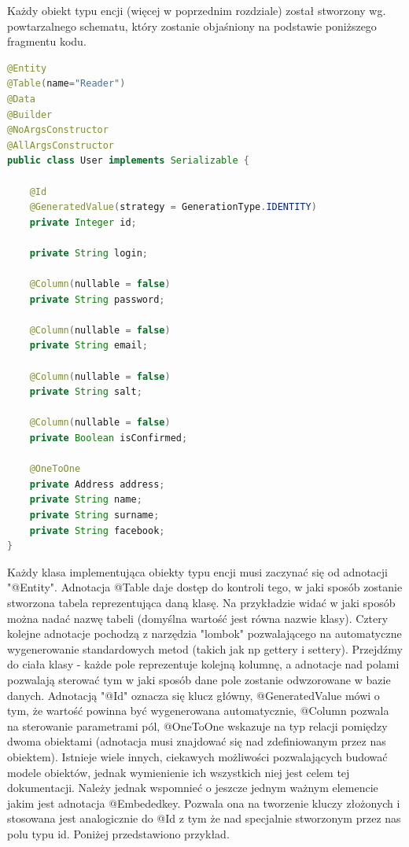 \documentclass{report}
\begin{document}
		Każdy obiekt typu encji (więcej w poprzednim rozdziale) został stworzony wg. powtarzalnego schematu, który zostanie objaśniony na podstawie poniższego fragmentu kodu.

		\begin{lstlisting}[language=Java, breaklines]
@Entity
@Table(name="Reader")
@Data
@Builder
@NoArgsConstructor
@AllArgsConstructor
public class User implements Serializable {

    @Id
    @GeneratedValue(strategy = GenerationType.IDENTITY)
    private Integer id;

    private String login;

    @Column(nullable = false)
    private String password;

    @Column(nullable = false)
    private String email;

    @Column(nullable = false)
    private String salt;

    @Column(nullable = false)
    private Boolean isConfirmed;

    @OneToOne
    private Address address;
    private String name;
    private String surname;
    private String facebook;
}
		\end{lstlisting}

		Każdy klasa implementująca obiekty typu encji musi zaczynać się od adnotacji "@Entity". Adnotacja @Table daje dostęp do kontroli tego, w jaki sposób zostanie stworzona tabela reprezentująca daną klasę. Na przykładzie widać w jaki sposób można nadać nazwę tabeli (domyślna wartość jest równa nazwie klasy). Cztery kolejne adnotacje pochodzą z narzędzia "lombok" pozwalającego na automatyczne wygenerowanie standardowych metod (takich jak np gettery i settery). Przejdźmy do ciała klasy - każde pole reprezentuje kolejną kolumnę, a adnotacje nad polami pozwalają sterować tym w jaki sposób dane pole zostanie odwzorowane w bazie danych. Adnotacją "@Id" oznacza się klucz główny, @GeneratedValue mówi o tym, że wartość powinna być wygenerowana automatycznie, @Column pozwala na sterowanie parametrami pól, @OneToOne wskazuje na typ relacji pomiędzy dwoma obiektami (adnotacja musi znajdować się nad zdefiniowanym przez nas obiektem). Istnieje wiele innych, ciekawych możliwości pozwalających budować modele obiektów, jednak wymienienie ich wszystkich niej jest celem tej dokumentacji. Należy jednak wspomnieć o jeszcze jednym ważnym elemencie jakim jest adnotacja @Embededkey. Pozwala ona na tworzenie kluczy złożonych i stosowana jest analogicznie do @Id z tym że nad specjalnie stworzonym przez nas polu typu id. Poniżej przedstawiono przykład.
\end{document}

